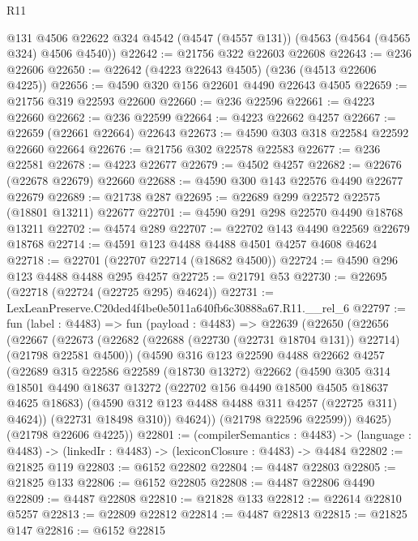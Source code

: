 \begin{lexlean}{R11}
\begin{coremodule}
    @131
    @4506
    @22622
    @324
    @4542
    (@4547 (@4557 @131))
    (@4563 (@4564 (@4565 @324) @4506 @4540))
@22642 := @21756 @322 @22603 @22608
@22643 := @236 @22606
@22650 := @22642 (@4223 @22643 @4505) (@236 (@4513 @22606 @4225))
@22656 := @4590 @320 @156 @22601 @4490 @22643 @4505
@22659 := @21756 @319 @22593 @22600
@22660 := @236 @22596
@22661 := @4223 @22660
@22662 := @236 @22599
@22664 := @4223 @22662 @4257
@22667 := @22659 (@22661 @22664) @22643
@22673 := @4590 @303 @318 @22584 @22592 @22660 @22664
@22676 := @21756 @302 @22578 @22583
@22677 := @236 @22581
@22678 := @4223 @22677
@22679 := @4502 @4257
@22682 := @22676 (@22678 @22679) @22660
@22688 := @4590 @300 @143 @22576 @4490 @22677 @22679
@22689 := @21738 @287
@22695 := @22689 @299 @22572 @22575 (@18801 @13211) @22677
@22701 := @4590 @291 @298 @22570 @4490 @18768 @13211
@22702 := @4574 @289
@22707 := @22702 @143 @4490 @22569 @22679 @18768
@22714 := @4591 @123 @4488 @4488 @4501 @4257 @4608 @4624
@22718 := @22701 (@22707 @22714 (@18682 @4500))
@22724 := @4590 @296 @123 @4488 @4488 @295 @4257
@22725 := @21791 @53
@22730 := @22695 (@22718 (@22724 (@22725 @295) @4624))
@22731 := LexLeanPreserve.C20ded4f4be0e5011a640fb6c30888a67.R11.__rel_6
@22797 := fun (label : @4483) =>
  fun (payload : @4483) =>
  @22639
    (@22650
      (@22656
        (@22667
          (@22673
            (@22682 (@22688 (@22730 (@22731 @18704 @131)) @22714) (@21798 @22581 @4500))
            (@4590
              @316
              @123
              @22590
              @4488
              @22662
              @4257
              (@22689
                @315
                @22586
                @22589
                (@18730 @13272)
                @22662
                (@4590
                  @305
                  @314
                  @18501
                  @4490
                  @18637
                  @13272
                  (@22702 @156 @4490 @18500 @4505 @18637 @4625 @18683)
                  (@4590 @312 @123 @4488 @4488 @311 @4257 (@22725 @311) @4624))
                (@22731 @18498 @310))
              @4624))
          (@21798 @22596 @22599))
        @4625)
      (@21798 @22606 @4225))
@22801 := (compilerSemantics : @4483) ->
  (language : @4483) -> (linkedIr : @4483) -> (lexiconClosure : @4483) -> @4484
@22802 := @21825 @119
@22803 := @6152 @22802
@22804 := @4487 @22803
@22805 := @21825 @133
@22806 := @6152 @22805
@22808 := @4487 @22806 @4490
@22809 := @4487 @22808
@22810 := @21828 @133
@22812 := @22614 @22810 @5257
@22813 := @22809 @22812
@22814 := @4487 @22813
@22815 := @21825 @147
@22816 := @6152 @22815

\end{coremodule}
\end{lexlean}
